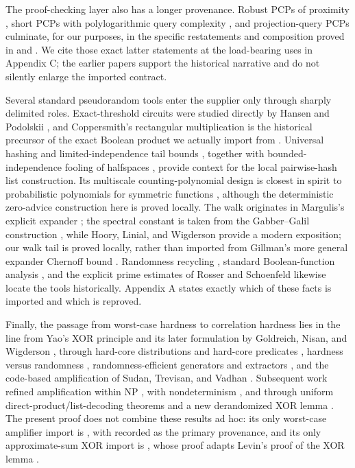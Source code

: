 \documentclass[11pt,letterpaper]{article}
\theoremstyle{definition}
\theoremstyle{remark}
\begin{document}
The proof-checking layer also has a longer provenance. Robust PCPs of
proximity \cite{BSGHSV06}, short PCPs with polylogarithmic query
complexity \cite{BS08}, and projection-query PCPs \cite{BV14} culminate,
for our purposes, in the specific restatements and composition proved in
\cite[Lemmas 25--27]{CW19} and
\cite[Lemmas 3.10--3.11 and Theorem 4.6]{CLW20}. We cite those exact latter
statements at the
load-bearing uses in Appendix C; the earlier papers support the
historical narrative and do not silently enlarge the imported contract.

Several standard pseudorandom tools enter the supplier only through
sharply delimited roles. Exact-threshold circuits were studied directly
by Hansen and Podolskii \cite{HP10}, and Coppersmith's
rectangular multiplication \cite{Cop82} is the historical precursor of
the exact Boolean product we actually import from \cite{WilACC14}.
Universal hashing \cite{CW79} and limited-independence tail bounds
\cite{SSS95}, together with bounded-independence fooling of halfspaces
\cite{DGJ10}, provide context for the local pairwise-hash list
construction. Its multiscale counting-polynomial design is closest in spirit
to probabilistic polynomials for symmetric functions \cite{AW15}, although
the deterministic zero-advice construction here is proved locally. The walk
originates in Margulis's explicit expander
\cite{Marg73}; the spectral constant is taken from the Gabber--Galil
construction \cite{GG81}, while Hoory, Linial, and
Wigderson \cite[Theorem 8.2]{HLW06} provide a modern exposition; our walk
tail is proved locally, rather than imported from
Gillman's more general expander Chernoff bound
\cite{Gil98}. Randomness recycling \cite{IZ89}, standard Boolean-function
analysis \cite{OD14}, and the explicit prime estimates of Rosser and
Schoenfeld \cite[Theorem 4, eq. (3.14)]{RS62} likewise locate the
tools historically. Appendix A states exactly which of these facts is
imported and which is reproved.

Finally, the passage from worst-case hardness to correlation hardness
lies in the line from Yao's XOR principle \cite{Yao82}
and its later formulation by Goldreich, Nisan, and Wigderson
\cite{GNW11}, through hard-core distributions \cite{Imp95} and hard-core
predicates \cite{GL89}, hardness versus randomness \cite{NW94,IW97},
randomness-efficient generators and extractors \cite{NZ96,Trevisan01},
and the code-based amplification of Sudan, Trevisan, and Vadhan
\cite[Theorem 24]{STV01}. Subsequent work refined amplification within NP
\cite{OD04}, with nondeterminism \cite{HVV06}, and through uniform
direct-product/list-decoding theorems \cite{IJK09,IJKW10} and a new
derandomized XOR lemma \cite{ChenLyu21}. The present proof does not
combine these results ad hoc: its only worst-case amplifier import is
\cite[Lemma 3.9]{CLW20}, with \cite[Theorem 24]{STV01} recorded as the
primary provenance, and its only approximate-sum XOR import is
\cite[Lemma 3.8]{CLW20}, whose proof adapts Levin's proof of the XOR lemma
\cite{Lev87}.
\end{document}
